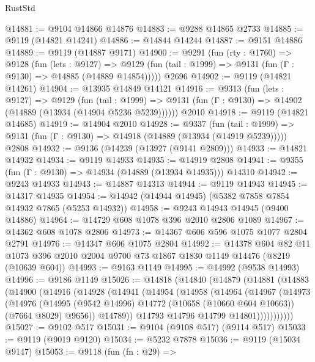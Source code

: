 \begin{lexlean}{RustStd}
\begin{coremodule}
@14881 := @9104 @14866 @14876
@14883 := @9288 @14865 @2733
@14885 := @9119 (@14821 @14241)
@14886 := @14844 @14244
@14887 := @9151 @14886
@14889 := @9119 (@14887 @9171)
@14900 := @9291
    (fun (rty : @1760) =>
    @9128
      (fun (lets : @9127) =>
      @9129 (fun (tail : @1999) => @9131 (fun (Γ : @9130) => @14885 (@14889 @14854)))))
    @2696
@14902 := @9119 (@14821 @14261)
@14904 := @13935 @14849 @14121
@14916 := @9313
    (fun (lets : @9127) =>
    @9129
      (fun (tail : @1999) =>
      @9131 (fun (Γ : @9130) => @14902 (@14889 (@13934 (@14904 @5236 @5239))))))
    @2010
@14918 := @9119 (@14821 @14685)
@14919 := @14904 @2010
@14928 := @9337
    (fun (tail : @1999) => @9131 (fun (Γ : @9130) => @14918 (@14889 (@13934 (@14919 @5239)))))
    @2808
@14932 := @9136 (@14239 (@13927 (@9141 @2809)))
@14933 := @14821 @14932
@14934 := @9119 @14933
@14935 := @14919 @2808
@14941 := @9355 (fun (Γ : @9130) => @14934 (@14889 (@13934 @14935))) @14310
@14942 := @9243 @14933
@14943 := @14887 @14313
@14944 := @9119 @14943
@14945 := @14317 @14935
@14954 := @14942 (@14944 @14945) (@5382 @7858 @7854 @14932 @7865 (@5253 @14932))
@14958 := @9243 @14943 @14945 (@9400 @14886)
@14964 := @14729 @608 @1078 @396 @2010 @2806 @1089
@14967 := @14362 @608 @1078 @2806
@14973 := @14367 @606 @596 @1075 @1077 @2804 @2791
@14976 := @14347 @606 @1075 @2804
@14992 := @14378
    @604
    @82
    @11
    @1073
    @396
    @2010
    @2004
    @9700
    @73
    @1867
    @1830
    @1149
    @14476
    (@8219 (@10639 @604))
@14993 := @9163 @1149
@14995 := @14992 (@9538 @14993)
@14996 := @9186 @1149
@15026 := @14818
    (@14840
      (@14879
        (@14881
          (@14883
            (@14900
              (@14916
                (@14928
                  (@14941
                    (@14954
                      (@14958
                        (@14964
                          (@14967
                            (@14973
                              (@14976
                                (@14995
                                  (@9542 @14996)
                                  @14772
                                  (@10658 (@10660 @604 @10663))
                                  (@7664 @8029)
                                  @9656))
                              @14789))
                          @14793
                          @14796
                          @14799
                          @14801)))))))))))
@15027 := @9102 @517
@15031 := @9104 (@9108 @517) (@9114 @517)
@15033 := @9119 (@9019 @9120)
@15034 := @5232 @7878
@15036 := @9119 (@15034 @9147)
@15053 := @9118
    (fun (fn : @29) =>

\end{coremodule}
\end{lexlean}
